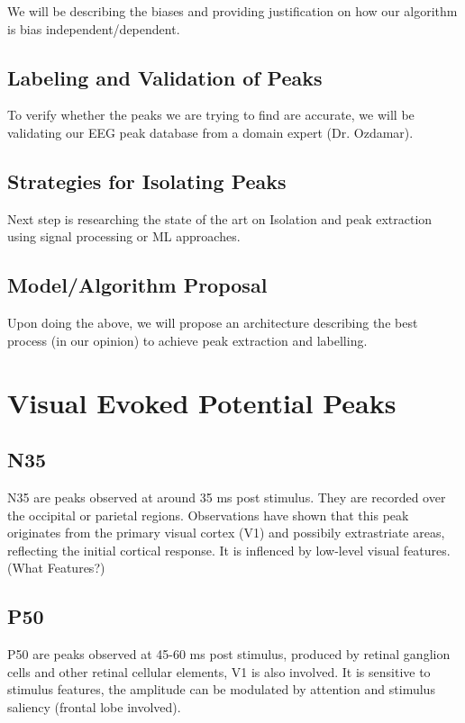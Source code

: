 \documentclass{article}
\begin{document}
	We will be describing the biases and providing justification on how our algorithm is bias independent/dependent.
	
	\subsection{Labeling and Validation of Peaks}
	
	To verify whether the peaks we are trying to find are accurate, we will be validating our EEG peak database from a domain expert (Dr. Ozdamar).
	
	\subsection{Strategies for Isolating Peaks}
	Next step is researching the state of the art on Isolation and peak extraction using signal processing or ML approaches.
	
	\subsection{Model/Algorithm Proposal}
	
	Upon doing the above, we will propose an architecture describing the best process (in our opinion) to achieve peak extraction and labelling.
	
	

		
	
	
	\newpage
	
	\section{Visual Evoked Potential Peaks}
	
	\subsection{N35}
	N35 are peaks observed at around 35 ms post stimulus. They are recorded over the occipital or parietal regions. Observations have shown that this peak originates from the primary visual cortex (V1) and possibily extrastriate areas, reflecting the initial cortical response. It is inflenced by low-level visual features. (What Features?)
	
	\subsection{P50}
	P50 are peaks observed at 45-60 ms post stimulus, produced by retinal ganglion cells and other retinal cellular elements, V1 is also involved. It is sensitive to stimulus features, the amplitude can be modulated by attention and stimulus saliency (frontal lobe involved).
	
\end{document}
